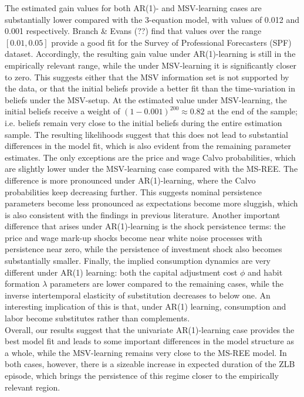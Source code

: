 \documentclass[12pt,reqno]{article}
\numberwithin{equation}{section}
\begin{document}
The estimated gain values for both AR(1)- and MSV-learning cases are substantially lower compared with the 3-equation model, with values of 0.012 and 0.001 respectively. Branch \& Evans (??) find that values over the range $[0.01,0.05]$ provide a good fit for the Survey of Professional Forecasters (SPF) dataset. Accordingly, the resulting gain value under AR(1)-learning is still in the empirically relevant range, while the under MSV-learning it is significantly closer to zero. This suggests either that the MSV information set is not supported by the data, or that the initial beliefs provide a better fit than the time-variation in beliefs under the MSV-setup. At the estimated value under MSV-learning, the initial beliefs receive a weight of $(1-0.001)^200 \approx 0.82$ at the end of the sample; i.e. beliefs remain very close to the initial beliefs during the entire estimation sample. The resulting likelihoods suggest that this does not lead to substantial differences in the model fit, which is also evident from the remaining parameter estimates. The only exceptions are the price and wage Calvo probabilities, which are slightly lower under the MSV-learning case compared with the MS-REE. The difference is more pronounced under AR(1)-learning, where the Calvo probabilities keep decreasing further. This suggests nominal persistence parameters become less pronounced as expectations become more sluggish, which is also consistent with the findings in previous literature. Another important difference that arises under AR(1)-learning is the shock persistence terms: the price and wage mark-up shocks become near white noise processes with persistence near zero, while the persistence of investment shock also becomes substantially smaller. Finally, the implied consumption dynamics are very different under AR(1) learning: both the capital adjustment cost $\phi$ and habit formation $\lambda$ parameters are lower compared to the remaining cases, while the inverse intertemporal elasticity of substitution decreases to below one. An interesting implication of this is that, under AR(1) learning, consumption and labor become substitutes rather than complements. \\
\noindent
Overall, our results suggest that the univariate AR(1)-learning case provides the best model fit and leads to some important differences in the model structure as a whole, while the MSV-learning remains very close to the MS-REE model. In both cases, however, there is a sizeable increase in expected duration of the ZLB episode, which brings the persistence of this regime closer to the empirically relevant region. \\
\noindent
\end{document}

